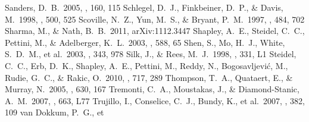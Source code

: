 \documentclass[apj]{emulateapj}
\begin{document}
\begin{thebibliography}{}
  Sanders, D.~B.\ 2005, \apjs, 160, 115 %
 Schlegel, D.~J., Finkbeiner,
  D.~P., \& Davis, M.\ 1998, \apj, 500, 525
 Scoville, N.~Z., Yun, M.~S., \&
  Bryant, P.~M.\ 1997, \apj, 484, 702
 Sharma, M., \& Nath,
  B.~B.\ 2011, arXiv:1112.3447
 Shapley, A.~E., Steidel, C.~C.,
  Pettini, M., \& Adelberger, K.~L.\ 2003, \apj, 588, 65
 Shen, S., Mo, H.~J., White,
  S.~D.~M., et al.\ 2003, \mnras, 343, 978
 Silk, J., \& Rees, M.~J.\ 1998,
  \aap, 331, L1
 Steidel, C.~C., Erb, D.~K.,
  Shapley, A.~E., Pettini, M., Reddy, N., Bogosavljevi{\'c}, M.,
  Rudie, G.~C., \& Rakic, O.\ 2010, \apj, 717, 289
 Thompson, T.~A., Quataert, E.,
  \& Murray, N.\ 2005, \apj, 630, 167
 Tremonti, C.~A., Moustakas, J.,
  \& Diamond-Stanic, A.~M.\ 2007, \apjl, 663, L77
 Trujillo, I., Conselice, C.~J.,
  Bundy, K., et al.\ 2007, \mnras, 382, 109
 van Dokkum, P.~G., et

\end{thebibliography}
\end{document}
